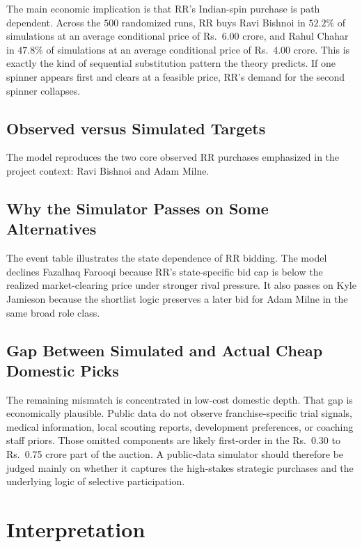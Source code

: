\documentclass[11pt]{article}
\begin{document}
The main economic implication is that RR's Indian-spin purchase is path dependent. Across the \(500\) randomized runs, RR buys Ravi Bishnoi in \(52.2\%\) of simulations at an average conditional price of Rs.\ 6.00 crore, and Rahul Chahar in \(47.8\%\) of simulations at an average conditional price of Rs.\ 4.00 crore. This is exactly the kind of sequential substitution pattern the theory predicts. If one spinner appears first and clears at a feasible price, RR's demand for the second spinner collapses.

\subsection{Observed versus Simulated Targets}



The model reproduces the two core observed RR purchases emphasized in the project context: Ravi Bishnoi and Adam Milne.

\subsection{Why the Simulator Passes on Some Alternatives}



The event table illustrates the state dependence of RR bidding. The model declines Fazalhaq Farooqi because RR's state-specific bid cap is below the realized market-clearing price under stronger rival pressure. It also passes on Kyle Jamieson because the shortlist logic preserves a later bid for Adam Milne in the same broad role class.

\subsection{Gap Between Simulated and Actual Cheap Domestic Picks}

The remaining mismatch is concentrated in low-cost domestic depth. That gap is economically plausible. Public data do not observe franchise-specific trial signals, medical information, local scouting reports, development preferences, or coaching staff priors. Those omitted components are likely first-order in the Rs.\ 0.30 to Rs.\ 0.75 crore part of the auction. A public-data simulator should therefore be judged mainly on whether it captures the high-stakes strategic purchases and the underlying logic of selective participation.

\section{Interpretation}
\end{document}
